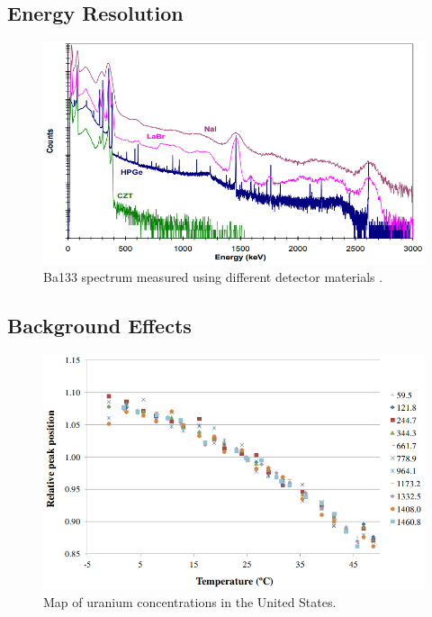 \subsection{Energy Resolution}


\begin{figure}[H]
\centering
\includegraphics[width=0.95\linewidth]{images/Ba133_spectrum_different_detector_materials_Market_Survey_Report}
\caption{Ba133 spectrum measured using different detector materials \cite{RIIDMarketSurveyReport}.}
\label{fig:uranium_concentration}
\end{figure}


\subsection{Background Effects}



\begin{figure}[H]
\centering
\includegraphics[width=0.95\linewidth]{images/temp_vs_relative_peak_position_CASANOVAS2012588}
\caption{Map of uranium concentrations in the United States.}
\label{fig:uranium_concentration}
\end{figure}


